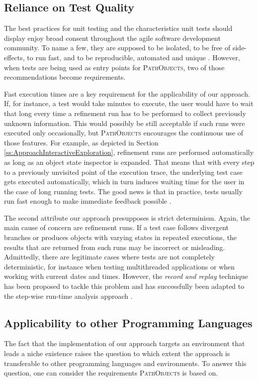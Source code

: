 \subsection{Reliance on Test Quality}
\label{ss:DiscussionLimitationsTestQuality}
The best practices for unit testing and the characteristics unit tests should display enjoy broad consent throughout the agile software development community.
To name a few, they are supposed to be isolated, to be free of side-effects, to run fast, and to be reproducible, automated and unique \cite{meszaros_xunit_2006, beck_test_2002}.
However, when tests are being used as entry points for \textsc{PathObjects}, two of those recommendations become requirements.

Fast execution times are a key requirement for the applicability of our approach.
If, for instance, a test would take minutes to execute, the user would have to wait that long every time a refinement run has to be performed to collect previously unknown information.
This would possibly be still acceptable if such runs were executed only occasionally, but \textsc{PathObjects} encourages the continuous use of those features.
For example, as depicted in Section \ref{ss:ApproachInteractiveExploration}, refinement runs are performed automatically as long as an object state inspector is expanded.
That means that with every step to a previously unvisited point of the execution trace, the underlying test case gets executed automatically, which in turn induces waiting time for the user in the case of long running tests. The good news is that in practice, tests usually run fast enough to make immediate feedback possible \cite{perscheid_immediacy_2010}.

The second attribute our approach presupposes is strict determinism.
Again, the main cause of concern are refinement runs.
If a test case follows divergent branches or produces objects with varying states in repeated executions, the results that are returned from such runs may be incorrect or misleading.
Admittedly, there are legitimate cases where tests are not completely deterministic, for instance when testing multithreaded applications or when working with current dates and times.
However, the \emph{record and replay} technique has been proposed to tackle this problem \cite{choi_deterministic_1998} and has successfully been adapted to the step-wise run-time analysis approach \cite{felgentreff_comparison_2012}.

\subsection{Applicability to other Programming Languages}
\label{ss:DiscussionApplicability}
The fact that the implementation of our approach targets an environment that leads a niche existence raises the question to which extent the approach is transferable to other programming languages and environments.
To answer this question, one can consider the requirements \textsc{PathObjects} is based on.


